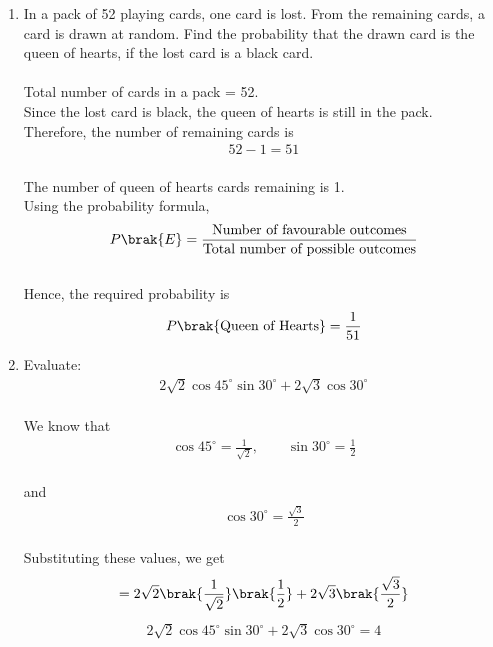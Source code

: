 \begin{enumerate}[label=\thesubsection.\arabic*, ref=\thesubsection.\theenumi]
Substituting $x=1$ and $y=1$ in \eqref{eq:EE26BTECH11211_Prob_17.1.10},
\begin{align}
7x-2y=7\brak{1}-2\brak{1}=7-2=5
\end{align}
Hence, the first equation is verified.
Substituting $x=1$ and $y=1$ in \eqref{eq:EE26BTECH11211_Prob_17.2.10},
\begin{align}
8x+7y=8\brak{1}+7\brak{1}=8+7=15
\end{align}
Hence, the second equation is also verified.
\begin{align}
 x=1,\quad y=1
\end{align}


\item
In a pack of 52 playing cards, one card is lost. From the remaining
cards, a card is drawn at random. Find the probability that the drawn
card is the queen of hearts, if the lost card is a black card.\\
\solution
\\Total number of cards in a pack = 52.
\\Since the lost card is black, the queen of hearts is still in the pack.
\\Therefore, the number of remaining cards is
\begin{align}
52-1=51
\end{align}
\\The number of queen of hearts cards remaining is 1.
\\Using the probability formula,
\begin{align}
P\brak{E}=\frac{\text{Number of favourable outcomes}}
{\text{Total number of possible outcomes}}
\end{align}
\\Hence, the required probability is
\begin{align}
P\brak{\text{Queen of Hearts}}=\frac{1}{51}
\end{align}

\item
Evaluate:
\begin{align}
2\sqrt{2}\cos 45^\circ \sin 30^\circ
+2\sqrt{3}\cos 30^\circ
\end{align}
\solution
\\We know that
\begin{align}
\cos 45^\circ=\frac{1}{\sqrt{2}},
\qquad
\sin 30^\circ=\frac{1}{2}
\end{align}
\\and
\begin{align}
\cos 30^\circ=\frac{\sqrt{3}}{2}
\end{align}
\\Substituting these values, we get
\begin{align}
=2\sqrt{2}\brak{\frac{1}{\sqrt{2}}}
\brak{\frac{1}{2}}
+2\sqrt{3}\brak{\frac{\sqrt{3}}{2}}
\end{align}
\begin{align}
2\sqrt{2}\cos 45^\circ \sin 30^\circ
+2\sqrt{3}\cos 30^\circ = 4
\end{align}


\end{enumerate}
